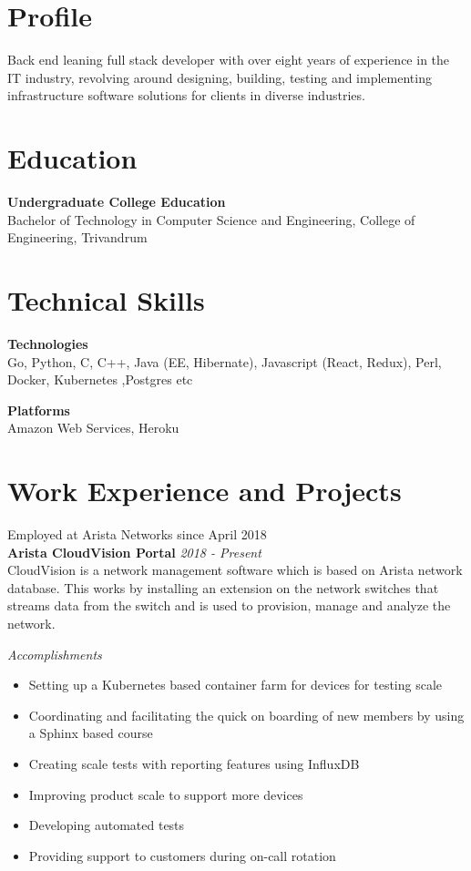 \documentclass[line,margin]{res}
\begin{document}


\address{jojiantony@yandex.com}
\address{+91 96323 41954}

\begin{resume}

\section{Profile}
Back end leaning full stack developer with over eight years of experience in the IT industry, revolving around designing, building, testing and implementing infrastructure software solutions for clients in diverse industries.

\section{Education}
{\bf Undergraduate College Education}\\
Bachelor of Technology in Computer Science and Engineering, College of Engineering, Trivandrum\\

\section{Technical Skills}

{\bf Technologies}\\
Go, Python, C, C++, Java (EE, Hibernate), Javascript (React, Redux), Perl, 
Docker, Kubernetes ,Postgres etc

{\bf Platforms}\\
Amazon Web Services, Heroku

\section{Work Experience and Projects}

Employed at Arista Networks since April 2018\\

{\bf Arista CloudVision Portal} \hfill {\it{2018 - Present}}\\

CloudVision is a network management software which is based on Arista network database. This works by installing an extension on the network switches that streams data from the switch and is used to provision, manage and analyze the network.

{\it{Accomplishments}}\\
\begin{itemize}
\item Setting up a Kubernetes based container farm for devices for testing scale
\item Coordinating and facilitating the quick on boarding of new members by using a Sphinx based course
\item Creating scale tests with reporting features using InfluxDB
\item Improving product scale to support more devices
\item Developing automated tests
\item Providing support to customers during on-call rotation
\end{itemize}


\end{resume}
\end{document}

